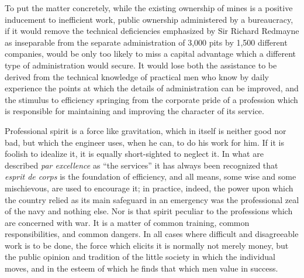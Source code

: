 \documentclass{book}
\begin{document}
To put the matter concretely, while the existing ownership of mines is a positive inducement to inefficient work, public ownership administered by a bureaucracy, if it would remove the technical deficiencies emphasized by Sir Richard Redmayne as inseparable from the separate administration of 3,000 pits by 1,500 different companies, would be only too likely to miss a capital advantage which a different type of administration would secure. It would lose both the assistance to be derived from the technical knowledge of practical men who know by daily experience the points at which the details of administration can be improved, and the stimulus to efficiency springing from the corporate pride of a profession which is responsible for maintaining and improving the character of its service.

Professional spirit is a force like gravitation, which in itself is neither good nor bad, but which the engineer uses, when he can, to do his work for him. If it is foolish to idealize it, it is equally short-sighted to neglect it. In what are described \emph{par excellence} as “the services” it has always been recognized that \emph{esprit de corps} is the foundation of efficiency, and all means, some wise and some mischievous, are used to encourage it; in practice, indeed, the power upon which the country relied as its main safeguard in an emergency was the professional zeal of the navy and nothing else. Nor is that spirit peculiar to the professions which are concerned with war. It is a matter of common training, common responsibilities, and common dangers. In all cases where difficult and disagreeable work is to be done, the force which elicits it is normally not merely money, but the public opinion and tradition of the little society in which the individual moves, and in the esteem of which he finds that which men value in success.
\end{document}
